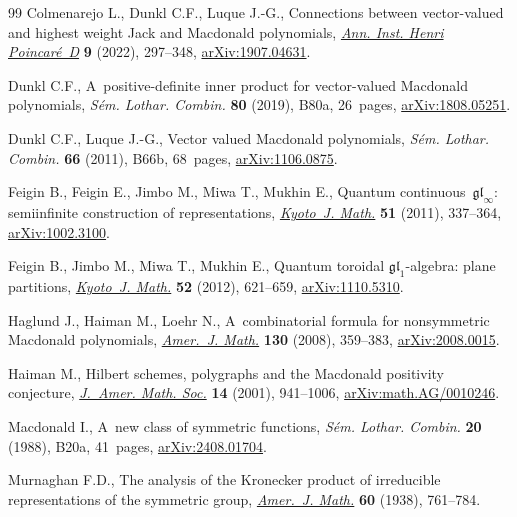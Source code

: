 \documentclass[pdftex]{sigma}
\numberwithin{equation}{section}
\theoremstyle{definition}
\begin{document}
\begin{thebibliography}{99}
Colmenarejo L., Dunkl C.F., Luque J.-G., Connections between vector-valued and
 highest weight {J}ack and {M}acdonald polynomials,
 \href{https://doi.org/10.4171/aihpd/119}{\textit{Ann. Inst. Henri
 Poincar\'e~D}} \textbf{9} (2022), 297--348,
 \href{http://arxiv.org/abs/1907.04631}{arXiv:1907.04631}.

Dunkl C.F., A~positive-definite inner product for vector-valued {M}acdonald
 polynomials, \textit{S\'em. Lothar. Combin.} \textbf{80} (2019), B80a,
 26~pages, \href{http://arxiv.org/abs/1808.05251}{arXiv:1808.05251}.

Dunkl C.F., Luque J.-G., Vector valued {M}acdonald polynomials, \textit{S\'em.
 Lothar. Combin.} \textbf{66} (2011), B66b, 68~pages,
 \href{http://arxiv.org/abs/1106.0875}{arXiv:1106.0875}.

Feigin B., Feigin E., Jimbo M., Miwa T., Mukhin E., Quantum
 continuous~{$\mathfrak{gl}_\infty$}: semiinfinite construction of
 representations,
 \href{https://doi.org/10.1215/21562261-1214375}{\textit{Kyoto~J. Math.}}
 \textbf{51} (2011), 337--364,
 \href{http://arxiv.org/abs/1002.3100}{arXiv:1002.3100}.

Feigin B., Jimbo M., Miwa T., Mukhin E., Quantum toroidal
 {$\mathfrak{gl}_1$}-algebra: plane partitions,
 \href{https://doi.org/10.1215/21562261-1625217}{\textit{Kyoto~J. Math.}}
 \textbf{52} (2012), 621--659,
 \href{http://arxiv.org/abs/1110.5310}{arXiv:1110.5310}.

Haglund J., Haiman M., Loehr N., A~combinatorial formula for nonsymmetric
 {M}acdonald polynomials,
 \href{https://doi.org/10.1353/ajm.2008.0015}{\textit{Amer.~J. Math.}}
 \textbf{130} (2008), 359--383,
 \href{http://arxiv.org/abs/2008.0015}{arXiv:2008.0015}.

Haiman M., Hilbert schemes, polygraphs and the {M}acdonald positivity
 conjecture,
 \href{https://doi.org/10.1090/S0894-0347-01-00373-3}{\textit{J.~Amer. Math.
 Soc.}} \textbf{14} (2001), 941--1006,
 \href{http://arxiv.org/abs/math.AG/0010246}{arXiv:math.AG/0010246}.

Macdonald I., A~new class of symmetric functions, \textit{S\'em. Lothar.
 Combin.} \textbf{20} (1988), B20a, 41~pages,
 \href{http://arxiv.org/abs/2408.01704}{arXiv:2408.01704}.

Murnaghan F.D., The analysis of the {K}ronecker product of irreducible
 representations of the symmetric group,
 \href{https://doi.org/10.2307/2371610}{\textit{Amer.~J. Math.}} \textbf{60}
 (1938), 761--784.


\end{thebibliography}
\end{document}
